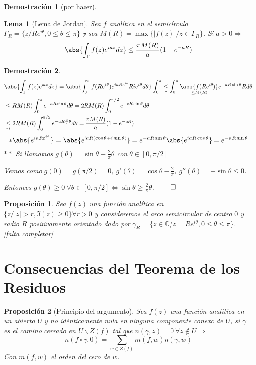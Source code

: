 \documentclass[10pt]{book}
\newtheorem{prop}{Proposición}[chapter]
\newtheorem*{dem}{Demostración}
\newtheorem{lema}{Lema}[chapter]
\newcommand{\C}{\mathbb{C}}
\begin{document}
\begin{dem}[por hacer]
\end{dem}

\begin{lema}[Lema de Jordan]
Sea $f$ analítica en el semicírculo $\Gamma_R = \{z/ Re^{i\theta},0\leq \theta\leq \pi\}$ y sea $M(R) = \max\{|f(z)|/ z\in \Gamma_R\}$. Si $a>0 \Rightarrow$
$$\abs{\int_\Gamma f(z)e^{iaz}dz} \leq \frac{\pi M(R)}{a}(1-e^{-aR})$$
\end{lema}

\begin{dem}
\begin{align*}
&\abs{\int_\Gamma f(z)e^{iaz}dz} = \abs{\int_0^\pi f(Re^{i\theta})e^{iaRe^{i\theta}}Rie^{i\theta}d\theta} \int_0^\pi \underset{*}{\leq} \int_0^\pi \underset{\leq M(R)}{\abs{f(Re^{i\theta})}}e^{-aR\sin\theta}Rd\theta\\
&\leq RM(R)\int_0^\pi e^{-aR\sin\theta}d\theta = 2RM(R)\int_0^{\pi/2} e^{-aR\sin\theta}d\theta\\
&\underset{**}{\leq} 2RM(R)\int_0^{\pi/2} e^{-aR\frac{2}{\pi}\theta}d\theta = \frac{\pi M(R)}{a}(1-e^{-aR})
\end{align*}
$$
* \abs{e^{iaRe^{i\theta}}} = \abs{e^{iaR(\cos\theta + i\sin\theta)}} = e^{-aR\sin\theta}\abs{e^{iaR\cos\theta}}=e^{-aR\sin\theta}
$$
$**$ Si llamamos $g(\theta) = \sin\theta -\frac{2}{\pi}\theta$ con $\theta \in[0,\pi/2]$

Vemos como $g(0) =g(\pi/2)=0$, $g'(\theta) = \cos\theta -\frac{2}{\pi}$, $g''(\theta) = -\sin\theta \leq 0$.

Entonces $g(\theta) \geq 0\ \forall \theta \in[0,\pi/2] \Leftrightarrow \sin\theta \geq \frac{2}{\pi}\theta$. $\qed$
\end{dem}

\begin{prop}
Sea $f(z)$ una función analítica en $\{z/|z|>r,\Im(z)\geq 0\}\forall r>0$ y consideremos el arco semicircular de centro $0$ y radio $R$ positivamente orientado dado por
$\gamma_R = \{z\in\C/ z = Re^{i\theta},0\leq \theta\leq \pi\}$.
[falta completar]
\end{prop}
\section{Consecuencias del Teorema de los Residuos}
\begin{prop}[Principio del argumento]
Sea $f(z)$ una función analítica en un abierto $U$ y no idénticamente nula en ninguna componente conexa de $U$, si $\gamma$ es el camino cerrado en $U\backslash Z(f)$ tal que $n(\gamma,z) = 0\ \forall z \notin U\Rightarrow$
$$n(f\circ\gamma,0) = \sum_{w\in Z(f)} m(f,w)n(\gamma,w)$$
Con $m(f,w)$ el orden del cero de $w$.
\end{prop}
\end{document}
